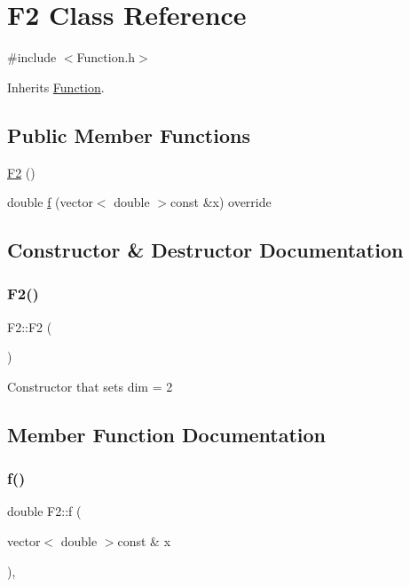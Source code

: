\hypertarget{class_f2}{}\section{F2 Class Reference}
\label{class_f2}


{\ttfamily \#include $<$Function.\+h$>$}



Inherits \hyperlink{class_function}{Function}.

\subsection*{Public Member Functions}
\begin{DoxyCompactItemize}
\item 
\hyperlink{class_f2_abdd1590225dbd49236e72f427f1b213c}{F2} ()
\item 
double \hyperlink{class_f2_a0850135dbfb59ce247ac1c4f013c4873}{f} (vector$<$ double $>$const \&x) override
\end{DoxyCompactItemize}


\subsection{Constructor \& Destructor Documentation}
\mbox{\label{class_f2_abdd1590225dbd49236e72f427f1b213c}} 
\subsubsection{\texorpdfstring{F2()}{F2()}}
{\footnotesize\ttfamily F2\+::\+F2 (\begin{DoxyParamCaption}{ }\end{DoxyParamCaption})\hspace{0.3cm}{\ttfamily [inline]}}

Constructor that sets dim = 2 

\subsection{Member Function Documentation}
\mbox{\label{class_f2_a0850135dbfb59ce247ac1c4f013c4873}} 
\subsubsection{\texorpdfstring{f()}{f()}}
{\footnotesize\ttfamily double F2\+::f (\begin{DoxyParamCaption}\item[{vector$<$ double $>$const \&}]{x }\end{DoxyParamCaption})\hspace{0.3cm}{\ttfamily [override]}, {\ttfamily [virtual]}}

